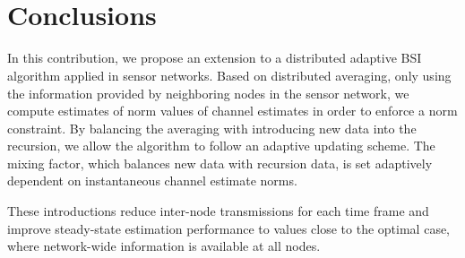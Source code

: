 \documentclass{article}
\begin{document}
\begin{figure}[t]
    \centering
    \\\vspace*{-1.0cm}
    \\\vspace*{-1.0cm}
    
    \caption[]{}
    \label{fig:simulations:NPMtimedyn}
\end{figure}

\section[]{Conclusions}
\label{sec:conclusions}
In this contribution, we propose an extension to a distributed adaptive BSI algorithm applied in sensor networks.
Based on distributed averaging, only using the information provided by neighboring nodes in the sensor network, we compute estimates of norm values of channel estimates in order to enforce a norm constraint.
By balancing the averaging with introducing new data into the recursion, we allow the algorithm to follow an adaptive updating scheme.
The mixing factor, which balances new data with recursion data, is set adaptively dependent on instantaneous channel estimate norms.

These introductions reduce inter-node transmissions for each time frame and improve steady-state estimation performance to values close to the optimal case, where network-wide information is available at all nodes.


\end{document}
